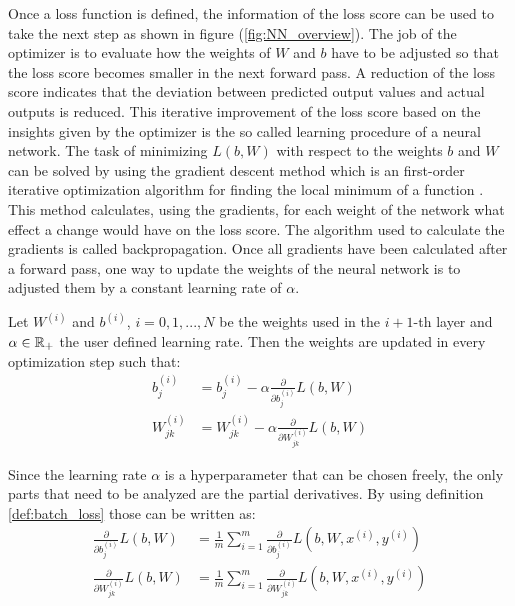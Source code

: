 Once a loss function is defined, the information of the loss score can be used to take the next step as shown in figure (\ref{fig:NN_overview}). The job of the optimizer is to evaluate how the weights of $W$ and $b$ have to be adjusted so that the loss score becomes smaller in the next forward pass. A reduction of the loss score indicates that the deviation between predicted output values and actual outputs is reduced. This iterative improvement of the loss score based on the insights given by the optimizer is the so called learning procedure of a neural network. The task of minimizing $L(b, W)$ with respect to the weights $b$ and $W$ can be solved by using the gradient descent method which is an  first-order iterative optimization algorithm for finding the local minimum of a function \cite{gradient_desc}. This method calculates, using the gradients, for each weight of the network what effect a change would have on the loss score. The algorithm used to calculate the gradients is called backpropagation. Once all gradients have been calculated after a forward pass, one way to update the weights of the neural network is to adjusted them by a constant learning rate of $\alpha$. 


\begin{remark}\label{rem:update}
	Let $W^{(i)}$ and $b^{(i)}$, $i = 0, 1, ..., N$ be the weights used in the $i+1$-th layer and $\alpha \in  \mathbb{R}_+$ the user defined learning rate. Then the weights are updated in every optimization step such that:
	\begin{align}
	b_j^{(i)} 		&= b_j^{(i)} - \alpha \frac{\partial}{\partial b_j^{(i)}} L(b, W)\\
	W_{jk}^{(i)} 	&= W_{jk}^{(i)} - \alpha \frac{\partial}{\partial W_{jk}^{(i)}} L(b, W)
	\end{align}	
\end{remark}

Since the learning rate $\alpha$ is a hyperparameter that can be chosen freely, the only parts that need to be analyzed are the partial derivatives. By using definition \ref{def:batch_loss} those can be written as:
\begin{align}
	\frac{\partial}{\partial b_j^{(i)}} L(b, W) 	&= \frac{1}{m} \sum_{i = 1}^m \frac{\partial}{\partial b_j^{(i)}} L(b, W, x^{(i)}, y^{(i)}) \label{eq:partial_deriv_without_regular_one} \\ 
	\frac{\partial}{\partial W_{jk}^{(i)}} L(b, W)	&= \frac{1}{m} \sum_{i = 1}^m \frac{\partial}{\partial W_{jk}^{(i)}} L(b, W, x^{(i)}, y^{(i)}) \label{eq:partial_deriv_without_regular}
\end{align}

